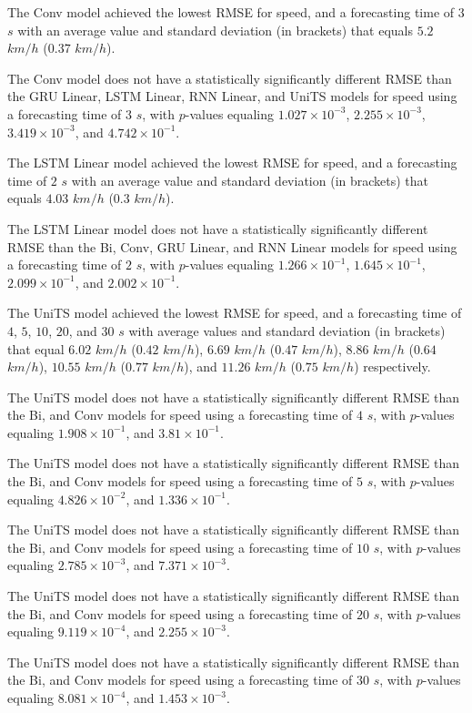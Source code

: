 The Conv model achieved the lowest RMSE for speed, and a forecasting time of $3$ $s$ with an average value and standard deviation (in brackets) that equals $5.2$ $km/h$ ($0.37$ $km/h$).

The Conv model does not have a statistically significantly different RMSE than the GRU Linear, LSTM Linear, RNN Linear, and UniTS models for speed using a forecasting time of $3$ $s$, with $p$-values equaling $1.027 \times 10^{-3}$, $2.255 \times 10^{-3}$, $3.419 \times 10^{-3}$, and $4.742 \times 10^{-1}$.

The LSTM Linear model achieved the lowest RMSE for speed, and a forecasting time of $2$ $s$ with an average value and standard deviation (in brackets) that equals $4.03$ $km/h$ ($0.3$ $km/h$).

The LSTM Linear model does not have a statistically significantly different RMSE than the Bi, Conv, GRU Linear, and RNN Linear models for speed using a forecasting time of $2$ $s$, with $p$-values equaling $1.266 \times 10^{-1}$, $1.645 \times 10^{-1}$, $2.099 \times 10^{-1}$, and $2.002 \times 10^{-1}$.

The UniTS model achieved the lowest RMSE for speed, and a forecasting time of $4$, $5$, $10$, $20$, and $30$ $s$ with average values and standard deviation (in brackets) that equal $6.02$ $km/h$ ($0.42$ $km/h$), $6.69$ $km/h$ ($0.47$ $km/h$), $8.86$ $km/h$ ($0.64$ $km/h$), $10.55$ $km/h$ ($0.77$ $km/h$), and $11.26$ $km/h$ ($0.75$ $km/h$) respectively.

The UniTS model does not have a statistically significantly different RMSE than the Bi, and Conv models for speed using a forecasting time of $4$ $s$, with $p$-values equaling $1.908 \times 10^{-1}$, and $3.81 \times 10^{-1}$.

The UniTS model does not have a statistically significantly different RMSE than the Bi, and Conv models for speed using a forecasting time of $5$ $s$, with $p$-values equaling $4.826 \times 10^{-2}$, and $1.336 \times 10^{-1}$.

The UniTS model does not have a statistically significantly different RMSE than the Bi, and Conv models for speed using a forecasting time of $10$ $s$, with $p$-values equaling $2.785 \times 10^{-3}$, and $7.371 \times 10^{-3}$.

The UniTS model does not have a statistically significantly different RMSE than the Bi, and Conv models for speed using a forecasting time of $20$ $s$, with $p$-values equaling $9.119 \times 10^{-4}$, and $2.255 \times 10^{-3}$.

The UniTS model does not have a statistically significantly different RMSE than the Bi, and Conv models for speed using a forecasting time of $30$ $s$, with $p$-values equaling $8.081 \times 10^{-4}$, and $1.453 \times 10^{-3}$.

